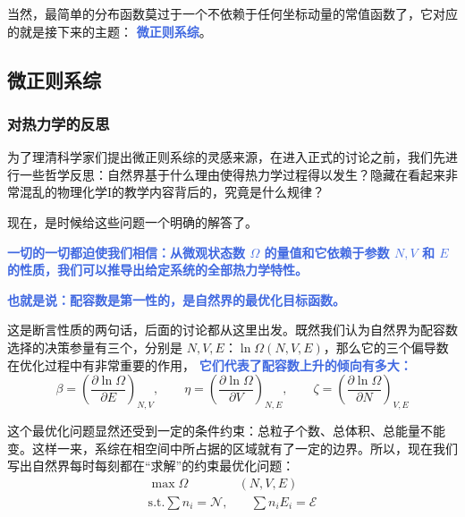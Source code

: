 \documentclass[hyperref,UTF-8]{ctexart}
\newcommand{\0}{\boldsymbol{0}}
\begin{document}
当然，最简单的分布函数莫过于一个不依赖于任何坐标动量的常值函数了，它对应的就是接下来的主题： \textcolor{RoyalBlue}{\textbf{\kaishu 微正则系综}}。



\subsection{微正则系综}

\subsubsection{对热力学的反思}

为了理清科学家们提出微正则系综的灵感来源，在进入正式的讨论之前，我们先进行一些哲学反思：自然界基于什么理由使得热力学过程得以发生？隐藏在看起来非常混乱的物理化学I的教学内容背后的，究竟是什么规律？

现在，是时候给这些问题一个明确的解答了。

\textcolor{RoyalBlue}{\textbf{\kaishu 一切的一切都迫使我们相信：从微观状态数 $\Omega$ 的量值和它依赖于参数 $N,V$ 和 $E$ 的性质，我们可以推导出给定系统的全部热力学特性。}}

\textcolor{RoyalBlue}{\textbf{\kaishu 也就是说：配容数是第一性的，是自然界的最优化目标函数。}}

这是断言性质的两句话，后面的讨论都从这里出发。既然我们认为自然界为配容数选择的决策参量有三个，分别是 $N,V,E$：$\ln\Omega(N,V,E)$，那么它的三个偏导数在优化过程中有非常重要的作用， \textcolor{RoyalBlue}{\textbf{\kaishu 它们代表了配容数上升的倾向有多大：}} 
\begin{equation}
    \beta = \left(\frac{\partial \ln\Omega}{\partial E}\right)_{N,V},\quad\quad \eta = \left(\frac{\partial \ln\Omega}{\partial V}\right)_{N,E},\quad\quad \zeta = \left(\frac{\partial \ln\Omega}{\partial N}\right)_{V,E}
\end{equation}

这个最优化问题显然还受到一定的条件约束：总粒子个数、总体积、总能量不能变。这样一来，系综在相空间中所占据的区域就有了一定的边界。所以，现在我们写出自然界每时每刻都在“求解”的约束最优化问题：
\begin{equation}\label{equ:optimizeI}
    \begin{split}
        \max \Omega&(N,V,E)\\
        \text{s.t.}\sum n_i = \mathcal{N},&\quad\sum n_iE_i = \mathcal{E}
    \end{split}
\end{equation}
\end{document}
